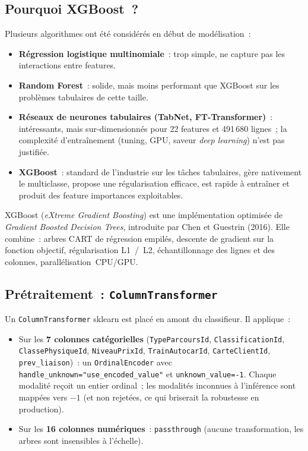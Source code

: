 \documentclass[11pt, a4paper]{article}
\begin{document}
\subsection{Pourquoi XGBoost~?}

Plusieurs algorithmes ont été considérés en début de modélisation~:
\begin{itemize}
\item \textbf{Régression logistique multinomiale}~: trop simple, ne
    capture pas les interactions entre features.
\item \textbf{Random Forest}~: solide, mais moins performant que
    XGBoost sur les problèmes tabulaires de cette taille.
\item \textbf{Réseaux de neurones tabulaires (TabNet, FT-Transformer)}~:
    intéressants, mais sur-dimensionnés pour 22 features et
    491\,680 lignes~; la complexité d'entraînement (tuning, GPU,
    saveur \textit{deep learning}) n'est pas justifiée.
\item \textbf{XGBoost}~: standard de l'industrie sur les tâches
    tabulaires, gère nativement le multiclasse, propose une
    régularisation efficace, est rapide à entraîner et produit des
    feature importances exploitables.
\end{itemize}

XGBoost (\textit{eXtreme Gradient Boosting}) est une implémentation
optimisée de \textit{Gradient Boosted Decision Trees}, introduite par
Chen et Guestrin (2016). Elle combine~: arbres CART de régression
empilés, descente de gradient sur la fonction objectif, régularisation
L1~/~L2, échantillonnage des lignes et des colonnes,
parallélisation~CPU/GPU.

\subsection{Prétraitement~: \texttt{ColumnTransformer}}

Un \texttt{ColumnTransformer} sklearn est placé en amont du
classifieur. Il applique~:
\begin{itemize}
\item Sur les \textbf{7 colonnes catégorielles} (\texttt{TypeParcoursId},
    \texttt{ClassificationId}, \texttt{ClassePhysiqueId},
    \texttt{NiveauPrixId}, \texttt{TrainAutocarId}, \texttt{CarteClientId},
    \texttt{prev\_liaison})~: un \texttt{OrdinalEncoder} avec
    \texttt{handle\_unknown="use\_encoded\_value"} et
    \texttt{unknown\_value=-1}. Chaque modalité reçoit un entier
    ordinal~; les modalités inconnues à l'inférence sont mappées vers
    $-1$ (et non rejetées, ce qui briserait la robustesse en
    production).
\item Sur les \textbf{16 colonnes numériques}~: \texttt{passthrough}
    (aucune transformation, les arbres sont insensibles à l'échelle).
\end{itemize}
\end{document}
